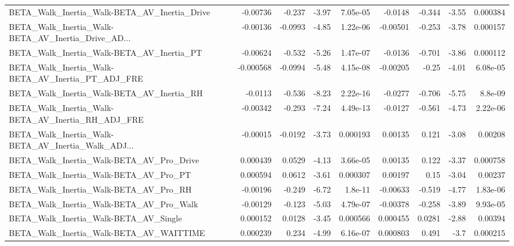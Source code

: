\begin{tabular}{lrrrrrrrr}
BETA\_Walk\_Inertia\_Walk-BETA\_AV\_Inertia\_Drive       &    -0.00736 &       -0.237 &    -3.97 & 7.05e-05 &    -0.0148 &      -0.344 &        -3.55 &      0.000384 \\
BETA\_Walk\_Inertia\_Walk-BETA\_AV\_Inertia\_Drive\_AD... &    -0.00136 &      -0.0993 &    -4.85 & 1.22e-06 &   -0.00501 &      -0.253 &        -3.78 &      0.000157 \\
BETA\_Walk\_Inertia\_Walk-BETA\_AV\_Inertia\_PT          &    -0.00624 &       -0.532 &    -5.26 & 1.47e-07 &    -0.0136 &      -0.701 &        -3.86 &      0.000112 \\
BETA\_Walk\_Inertia\_Walk-BETA\_AV\_Inertia\_PT\_ADJ\_FRE  &   -0.000568 &      -0.0994 &    -5.48 & 4.15e-08 &   -0.00205 &       -0.25 &        -4.01 &      6.08e-05 \\
BETA\_Walk\_Inertia\_Walk-BETA\_AV\_Inertia\_RH          &     -0.0113 &       -0.536 &    -8.23 & 2.22e-16 &    -0.0277 &      -0.706 &        -5.75 &       8.8e-09 \\
BETA\_Walk\_Inertia\_Walk-BETA\_AV\_Inertia\_RH\_ADJ\_FRE  &    -0.00342 &       -0.293 &    -7.24 & 4.49e-13 &    -0.0127 &      -0.561 &        -4.73 &      2.22e-06 \\
BETA\_Walk\_Inertia\_Walk-BETA\_AV\_Inertia\_Walk\_ADJ... &    -0.00015 &      -0.0192 &    -3.73 & 0.000193 &    0.00135 &       0.121 &        -3.08 &       0.00208 \\
BETA\_Walk\_Inertia\_Walk-BETA\_AV\_Pro\_Drive           &    0.000439 &       0.0529 &    -4.13 & 3.66e-05 &    0.00135 &       0.122 &        -3.37 &      0.000758 \\
BETA\_Walk\_Inertia\_Walk-BETA\_AV\_Pro\_PT              &    0.000594 &       0.0612 &    -3.61 & 0.000307 &    0.00197 &        0.15 &        -3.04 &       0.00237 \\
BETA\_Walk\_Inertia\_Walk-BETA\_AV\_Pro\_RH              &    -0.00196 &       -0.249 &    -6.72 &  1.8e-11 &   -0.00633 &      -0.519 &        -4.77 &      1.83e-06 \\
BETA\_Walk\_Inertia\_Walk-BETA\_AV\_Pro\_Walk            &    -0.00129 &       -0.123 &    -5.03 & 4.79e-07 &   -0.00378 &      -0.258 &        -3.89 &      9.93e-05 \\
BETA\_Walk\_Inertia\_Walk-BETA\_AV\_Single              &    0.000152 &       0.0128 &    -3.45 & 0.000566 &   0.000455 &      0.0281 &        -2.88 &       0.00394 \\
BETA\_Walk\_Inertia\_Walk-BETA\_AV\_WAITTIME            &    0.000239 &        0.234 &    -4.99 & 6.16e-07 &   0.000803 &       0.491 &         -3.7 &      0.000215 \\

\end{tabular}
